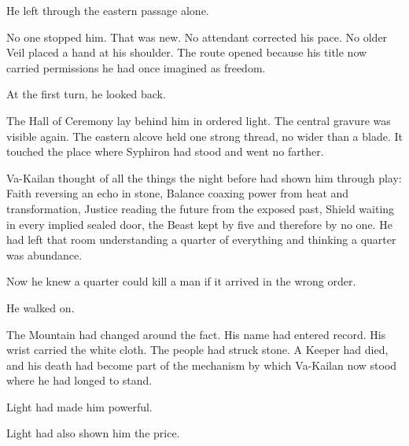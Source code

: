 He left through the eastern passage alone.\par
No one stopped him.
That was new.
No attendant corrected his pace.
No older Veil placed a hand at his shoulder.
The route opened because his title now carried permissions he had once imagined as freedom.\par
At the first turn, he looked back.\par
The Hall of Ceremony lay behind him in ordered light.
The central gravure was visible again.
The eastern alcove held one strong thread, no wider than a blade.
It touched the place where Syphiron had stood and went no farther.\par
Va-Kailan thought of all the things the night before had shown him through play: Faith reversing an echo in stone, Balance coaxing power from heat and transformation, Justice reading the future from the exposed past, Shield waiting in every implied sealed door, the Beast kept by five and therefore by no one.
He had left that room understanding a quarter of everything and thinking a quarter was abundance.\par
Now he knew a quarter could kill a man if it arrived in the wrong order.\par
He walked on.\par
The Mountain had changed around the fact.
His name had entered record.
His wrist carried the white cloth.
The people had struck stone.
A Keeper had died, and his death had become part of the mechanism by which Va-Kailan now stood where he had longed to stand.\par
Light had made him powerful.\par
Light had also shown him the price.\par
\ornament
